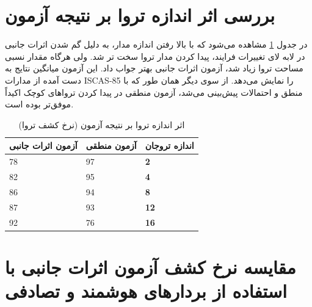 \section{بررسی اثر اندازه تروا بر نتیجه آزمون}
در جدول \ref{tsize} مشاهده می‌شود که با بالا رفتن اندازه مدار، به دلیل گم شدن اثرات جانبی در لابه لای تغییرات فرایند، پیدا کردن مدار تروا سخت تر شد. ولی هرگاه مقدار نسبی مساحت تروا زیاد شد، آزمون اثرات جانبی بهتر جواب داد. این آزمون میانگین نتایج به دست آمده از مدارات ISCAS-85 را نمایش می‌دهد. از سوی دیگر همان طور که با منطق و احتمالات پیش‌بینی می‌شد، آزمون منطقی در پیدا کردن تروا‌های کوچک اکیداً موفق‌تر بوده است.
\begin{table}[t]
	
	\begin{center} 
		\begin{tabular}{| p{4cm} | p{4cm} |p{1cm}|}
			\hline
			\textbf{ آزمون اثرات جانبی} & \textbf{ آزمون منطقی} & \textbf{اندازه تروجان}\\ \hline \hline
			78 & 97 &\textbf{2} \\ \hline
			82 & 95 &\textbf{4} \\ \hline
			86 & 94 &\textbf{8} \\ \hline
			87 & 93 &\textbf{12} \\ \hline
			92 & 76 &\textbf{16} \\ \hline
		\end{tabular}
		\caption{
			اثر اندازه تروا بر نتیجه آزمون (نرخ کشف تروا)}
		\label{tsize}
	\end{center}
\end{table}

\section{مقایسه نرخ کشف آزمون اثرات جانبی با استفاده از بردارهای هوشمند و تصادفی}






